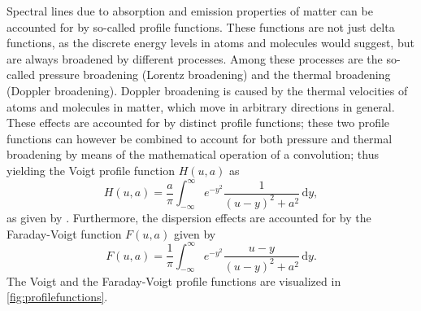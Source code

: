 \documentclass[a4paper,12pt]{report}
\begin{document}
Spectral lines due to absorption and emission properties of matter can be accounted for by so-called profile functions. These functions are not just delta functions, as the discrete energy levels in atoms and molecules would suggest, but are always broadened by different processes. Among these processes are the so-called pressure broadening (Lorentz broadening) and the thermal broadening (Doppler broadening). Doppler broadening is caused by the thermal velocities of atoms and molecules in matter, which move in arbitrary directions in general. These effects are accounted for by distinct profile functions; these two profile functions can however be combined to account for both pressure and thermal broadening by means of the mathematical operation of a convolution; thus yielding the Voigt profile function $H(u,a)$ as \begin{equation}\label{eq:Voigt_Profile}
H(u,a) = \frac{a}{\pi}\int_{-\infty}^{\infty}e^{-y^2}\frac{1}{(u-y)^2+ a^2}\,\mathrm{d}y, \end{equation} as given by \cite[p.100]{delToroIniesta.2003}. Furthermore, the dispersion effects are accounted for by the Faraday-Voigt function $F(u,a)$ given by \begin{equation}\label{eq:Faraday_Voigt_Profile}
F(u,a) = \frac{1}{\pi}\int_{-\infty}^{\infty}e^{-y^2}\frac{u-y}{(u-y)^2+a^2}\,\mathrm{d}y.
\end{equation} The Voigt and the Faraday-Voigt profile functions are visualized in \cref{fig:profilefunctions}.
\end{document}
